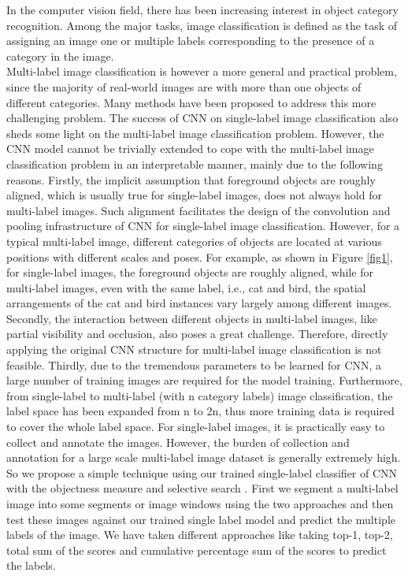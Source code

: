 In the computer vision field, there has been increasing interest in object category recognition. Among the major tasks, image classification is defined as the task of assigning an image one or multiple labels corresponding to the presence of a category in the image.\\
Multi-label image classification is however a more
general and practical problem, since the majority of real-world images are with more than one objects
of different categories. Many methods
have been proposed to address this more challenging
problem. The success of CNN on single-label image
classification also sheds some light on the multi-label image classification problem. However, the CNN
model cannot be trivially extended to cope with the
multi-label image classification problem in an interpretable manner, mainly due to the following reasons.
Firstly, the implicit assumption that foreground objects are roughly aligned, which is usually true for
single-label images, does not always hold for multi-label images. Such alignment facilitates the design of
the convolution and pooling infrastructure of CNN
for single-label image classification. However, for a
typical multi-label image, different categories of objects are located at various positions with different
scales and poses. For example, as shown in Figure \ref{fig1},
for single-label images, the foreground objects are
roughly aligned, while for multi-label images, even
with the same label, i.e., cat and bird, the spatial arrangements of the cat and bird instances
vary largely among different images. Secondly, the
interaction between different objects in multi-label
images, like partial visibility and occlusion, also poses
a great challenge. Therefore, directly applying the
original CNN structure for multi-label image classification is not feasible. Thirdly, due to the tremendous
parameters to be learned for CNN, a large number of
training images are required for the model training.
Furthermore, from single-label to multi-label (with n
category labels) image classification, the label space
has been expanded from n to 2n, thus more training data is required to cover the whole label space. For
single-label images, it is practically easy to collect
and annotate the images. However, the burden of
collection and annotation for a large scale multi-label
image dataset is generally extremely high.\\
So we propose a simple technique using our trained single-label classifier of CNN with the objectness measure \cite{1} and selective search \cite{2}. First we segment a multi-label image into some segments or image windows using the two approaches and then test these images against our trained single label model and predict the multiple labels of the image. We have taken different approaches like taking top-1, top-2, total sum of the scores and cumulative percentage sum of the scores to predict the labels.

